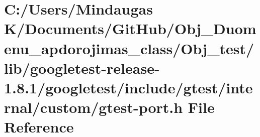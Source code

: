 \hypertarget{_obj__test_2lib_2googletest-release-1_88_81_2googletest_2include_2gtest_2internal_2custom_2gtest-port_8h}{}\section{C\+:/\+Users/\+Mindaugas K/\+Documents/\+Git\+Hub/\+Obj\+\_\+\+Duomenu\+\_\+apdorojimas\+\_\+class/\+Obj\+\_\+test/lib/googletest-\/release-\/1.8.1/googletest/include/gtest/internal/custom/gtest-\/port.h File Reference}
\label{_obj__test_2lib_2googletest-release-1_88_81_2googletest_2include_2gtest_2internal_2custom_2gtest-port_8h}
